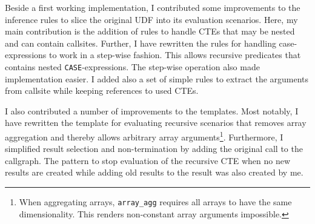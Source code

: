 Beside a first working implementation, I contributed some improvements to the inference rules to slice the original UDF into its evaluation scenarios. Here, my main contribution is the addition of rules to handle CTEs that may be nested and can contain callsites. Further, I have rewritten the rules for handling case-expressions to work in a step-wise fashion. This allows recursive predicates that contains nested \texttt{CASE}-expressions. The step-wise operation also made implementation easier. I added also a set of simple rules to extract the arguments from callsite while keeping references to used CTEs.

I also contributed a number of improvements to the templates. Most notably, I have rewritten the template for evaluating recursive scenarios that removes array aggregation and thereby allows arbitrary array arguments\footnote{When aggregating arrays, \texttt{array\_agg} requires all arrays to have the same dimensionality. This renders non-constant array arguments impossible.}. Furthermore, I simplified result selection and non-termination by adding the original call to the callgraph. The pattern to stop evaluation of the recursive CTE when no new results are created while adding old results to the result was also created by me.


